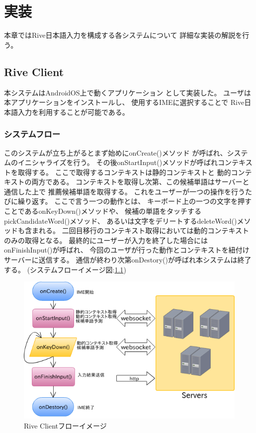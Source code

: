 \chapter{実装}
\label{chap:implementation}
本章ではRive日本語入力を構成する各システムについて
詳細な実装の解説を行う。

\newpage
\section{Rive Client}
\label{sec:riveclient}
本システムはAndroidOS上で動くアプリケーション
として実装した。
ユーザは本アプリケーションをインストールし、
使用するIMEに選択することで
Rive日本語入力を利用することが可能である。

\subsection{システムフロー}
このシステムが立ち上がるとまず始めにonCreate()メソッド
が呼ばれ、システムのイニシャライズを行う。
その後onStartInput()メソッドが呼ばれコンテキストを取得する。
ここで取得するコンテキストは静的コンテキストと
動的コンテキストの両方である。
コンテキストを取得し次第、この候補単語はサーバーと通信した上で
推薦候補単語を取得する。
これをユーザーが一つの操作を行うたびに繰り返す。
ここで言う一つの動作とは、
キーボード上の一つの文字を押すことであるonKeyDown()メソッドや、
候補の単語をタッチするpickCandidateWord()メソッド、
あるいは文字をデリートするdeleteWord()メソッドも含まれる。
二回目移行のコンテキスト取得においては動的コンテキストのみの取得となる。
最終的にユーザーが入力を終了した場合にはonFinishInput()が呼ばれ、
今回のユーザが行った動作とコンテキストを紐付けサーバーに送信する。
通信が終わり次第onDestory()が呼ばれ本システムは終了する。
(システムフローイメージ図:\ref{fig:clientflow})
\begin{figure}[htbp]
  \begin{center}
    \includegraphics[width=140mm,bb=0 0 562 366]{images/clientflow}
  \end{center}
  \caption{Rive Clientフローイメージ}
  \label{fig:clientflow}
\end{figure}

